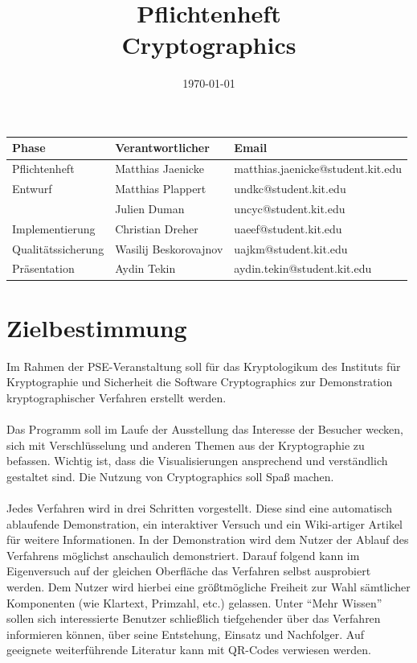 \documentclass{article}
\title{\textbf{Pflichtenheft} \\ Cryptographics}
\author{}
\date{\today}
\begin{document}
\maketitle
\begin{table}[b]
  \begin{tabular}{| l | l | l |}
    \hline
    \textbf{Phase} & \textbf{Verantwortlicher} & \textbf{Email} \\ \hline
    Pflichtenheft & Matthias Jaenicke & matthias.jaenicke@student.kit.edu \\ \hline
    Entwurf & Matthias Plappert & undkc@student.kit.edu \\
            & Julien Duman & uncyc@student.kit.edu \\ \hline
    Implementierung & Christian Dreher & uaeef@student.kit.edu \\ \hline
    Qualitätssicherung & Wasilij Beskorovajnov & uajkm@student.kit.edu \\ \hline
    Präsentation & Aydin Tekin & aydin.tekin@student.kit.edu \\ \hline
    \end{tabular}
\end{table}
\newpage


\tableofcontents
\newpage

\section{Zielbestimmung}

Im Rahmen der \gls{PSE}-Veranstaltung soll für das \gls{Kryptologikum} des Instituts für
Kryptographie und Sicherheit die Software \gls{Cryptographics} zur
Demonstration kryptographischer Verfahren erstellt werden. \\
\\
Das Programm soll im Laufe der Ausstellung das Interesse der Besucher wecken, sich mit Verschlüsselung und anderen Themen aus der Kryptographie zu befassen. Wichtig ist, dass die Visualisierungen ansprechend und verständlich gestaltet sind. Die Nutzung von \gls{Cryptographics} soll Spaß machen. \\
\\
Jedes Verfahren wird in drei Schritten vorgestellt. Diese sind eine automatisch ablaufende Demonstration, ein interaktiver Versuch und ein Wiki-artiger Artikel für weitere Informationen.
In der Demonstration wird dem Nutzer der Ablauf des Verfahrens möglichst anschaulich demonstriert. Darauf folgend kann im Eigenversuch auf der gleichen Oberfläche das Verfahren selbst ausprobiert werden. Dem Nutzer wird hierbei eine größtmögliche Freiheit zur Wahl sämtlicher Komponenten (wie Klartext, Primzahl, etc.) gelassen. Unter ``Mehr Wissen'' sollen sich interessierte Benutzer schließlich tiefgehender über das Verfahren informieren können, über seine Entstehung, Einsatz und Nachfolger. Auf geeignete weiterführende Literatur kann mit QR-Codes verwiesen werden. \\
\end{document}
